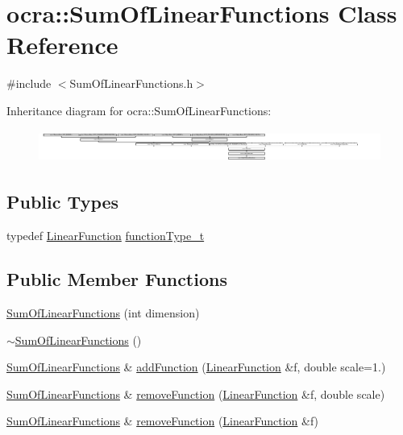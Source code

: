 \hypertarget{classocra_1_1SumOfLinearFunctions}{}\section{ocra\+:\+:Sum\+Of\+Linear\+Functions Class Reference}
\label{classocra_1_1SumOfLinearFunctions}


{\ttfamily \#include $<$Sum\+Of\+Linear\+Functions.\+h$>$}

Inheritance diagram for ocra\+:\+:Sum\+Of\+Linear\+Functions\+:\begin{figure}[H]
\begin{center}
\leavevmode
\includegraphics[height=1.082126cm]{d0/d8f/classocra_1_1SumOfLinearFunctions}
\end{center}
\end{figure}
\subsection*{Public Types}
\begin{DoxyCompactItemize}
\item 
typedef \hyperlink{classocra_1_1LinearFunction}{Linear\+Function} \hyperlink{classocra_1_1SumOfLinearFunctions_ae7f2c949cbda9d69d13e64e5bfeb5fa9}{function\+Type\+\_\+t}
\end{DoxyCompactItemize}
\subsection*{Public Member Functions}
\begin{DoxyCompactItemize}
\item 
\hyperlink{classocra_1_1SumOfLinearFunctions_a70b277cb77618691688b7b6151ec126d}{Sum\+Of\+Linear\+Functions} (int dimension)
\item 
\hyperlink{classocra_1_1SumOfLinearFunctions_a0ca0f87d5eee6117cd521130a831d90e}{$\sim$\+Sum\+Of\+Linear\+Functions} ()
\item 
\hyperlink{classocra_1_1SumOfLinearFunctions}{Sum\+Of\+Linear\+Functions} \& \hyperlink{classocra_1_1SumOfLinearFunctions_a9ab412e1232557d36a84145360d57da7}{add\+Function} (\hyperlink{classocra_1_1LinearFunction}{Linear\+Function} \&f, double scale=1.)
\item 
\hyperlink{classocra_1_1SumOfLinearFunctions}{Sum\+Of\+Linear\+Functions} \& \hyperlink{classocra_1_1SumOfLinearFunctions_a2d3525455d1f4d2c19c7a72a33d1d600}{remove\+Function} (\hyperlink{classocra_1_1LinearFunction}{Linear\+Function} \&f, double scale)
\item 
\hyperlink{classocra_1_1SumOfLinearFunctions}{Sum\+Of\+Linear\+Functions} \& \hyperlink{classocra_1_1SumOfLinearFunctions_af22a2dd5debe1c87a4e3e664727e8754}{remove\+Function} (\hyperlink{classocra_1_1LinearFunction}{Linear\+Function} \&f)
\end{DoxyCompactItemize}
